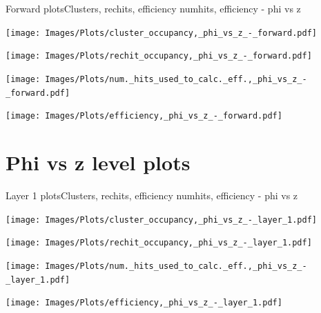 \documentclass{beamer}
\begin{document}
\begin{frame}{Forward plots}{Clusters, rechits, efficiency numhits, efficiency - phi vs z}
  \hspace{0.01\textwidth}%
  \begin{minipage}{0.45\textwidth}
    \centering
    \texttt{[image: Images/Plots/cluster\_occupancy,\_phi\_vs\_z\_-\_forward.pdf]}
  \end{minipage}%
  \hspace{0.01\textwidth}%
  \begin{minipage}{0.45\textwidth}
    \centering
    \texttt{[image: Images/Plots/rechit\_occupancy,\_phi\_vs\_z\_-\_forward.pdf]}
  \end{minipage}
  \vspace*{0.2cm}
  \begin{minipage}{0.45\textwidth}
    \centering
    \texttt{[image: Images/Plots/num.\_hits\_used\_to\_calc.\_eff.,\_phi\_vs\_z\_-\_forward.pdf]}
  \end{minipage}%
  \hspace{0.01\textwidth}%
  \begin{minipage}{0.45\textwidth}
    \centering
    \texttt{[image: Images/Plots/efficiency,\_phi\_vs\_z\_-\_forward.pdf]}
  \end{minipage}
\end{frame}

\section{Phi vs z level plots}

\begin{frame}{Layer 1 plots}{Clusters, rechits, efficiency numhits, efficiency - phi vs z}
  \hspace{0.01\textwidth}%
  \begin{minipage}{0.45\textwidth}
    \centering
    \texttt{[image: Images/Plots/cluster\_occupancy,\_phi\_vs\_z\_-\_layer\_1.pdf]}
  \end{minipage}%
  \hspace{0.01\textwidth}%
  \begin{minipage}{0.45\textwidth}
    \centering
    \texttt{[image: Images/Plots/rechit\_occupancy,\_phi\_vs\_z\_-\_layer\_1.pdf]}
  \end{minipage}
  \vspace*{0.2cm}
  \begin{minipage}{0.45\textwidth}
    \centering
    \texttt{[image: Images/Plots/num.\_hits\_used\_to\_calc.\_eff.,\_phi\_vs\_z\_-\_layer\_1.pdf]}
  \end{minipage}%
  \hspace{0.01\textwidth}%
  \begin{minipage}{0.45\textwidth}
    \centering
    \texttt{[image: Images/Plots/efficiency,\_phi\_vs\_z\_-\_layer\_1.pdf]}
  \end{minipage}
\end{frame}
\end{document}
